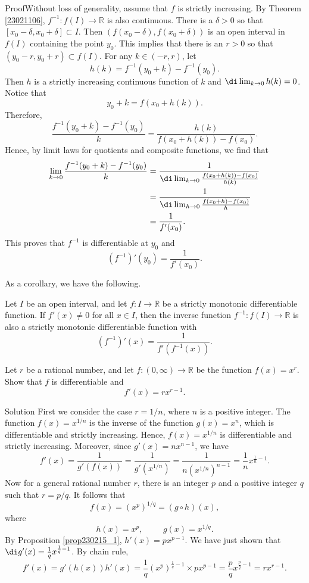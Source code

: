 \begin{myproof}{Proof}Without loss of generality, assume that $f$ is strictly increasing. 
By Theorem \ref{23021106}, $f^{-1}:f(I)\to\mathbb{R}$ is also continuous.
There is a  $\delta>0$ so that $[x_0-\delta, x_0+\delta]\subset I$. Then $(f(x_0-\delta), f(x_0+\delta))$ is an open interval in $f(I)$ containing the point $y_0$.  This implies that there is an $r>0$ so that $(y_0-r, y_0+r)\subset f(I)$. For any $k\in (-r, r)$, let 
\[h(k)=f^{-1}(y_0+k)-f^{-1}(y_0).\]Then $h$ is a strictly increasing continuous function of $k$ and  $\di\lim_{k\to 0}h(k)=0$. Notice that
\[y_0+k=f(x_0+h(k)).\]
Therefore,
\[\frac{f^{-1}(y_0+k)-f^{-1}(y_0)}{k}=\frac{h(k)}{f(x_0+h(k))-f(x_0)}.\]
\bp
Hence, by limit laws for quotients and composite functions,
we find that
\begin{align*}
\lim_{k\to 0}\frac{f^{-1}(y_0+k)-f^{-1}(y_0)}{k}&=\frac{1}{\di \lim_{k\rightarrow 0}\frac{f(x_0+h(k))-f(x_0)}{h(k)}}\\&=\frac{1}{\di \lim_{h\rightarrow 0}\frac{f(x_0+h)-f(x_0)}{h}}\\&=\frac{1}{f'(x_0)}.\end{align*}
This proves that $f^{-1}$ is differentiable at $y_0$ and
\[(f^{-1})'(y_0)=\frac{1}{f'(x_0)}.\]

 \end{myproof}

As a corollary, we have the following.
\begin{corollary}{}
Let $I$ be an open interval, and let $f:I\to\mathbb{R}$ be a strictly monotonic differentiable function. If $f'(x)\neq 0 $ for all $x\in I$, then the inverse function $f^{-1}:f(I)\to\mathbb{R}$ is also a strictly monotonic differentiable function with
\[(f^{-1})'(x)=\frac{1}{f'(f^{-1}(x))}.\]
\end{corollary}
 
\begin{example}{}
Let $r$ be a rational number, and let $f:(0,\infty)\to \mathbb{R}$ be the function $f(x)=x^r$. Show that $f$ is differentiable and 
\[f'(x)=rx^{r-1}.\]

\end{example}
\begin{solution}{Solution}
First we consider the case  $r=1/n$, where $n$ is a positive integer. The function $f(x)=x^{1/n}$ is the inverse of the function $g(x)=x^n$, which is differentiable and strictly increasing. Hence, $f(x)=x^{1/n}$ is differentiable and strictly increasing. Moreover, since $g'(x)=nx^{n-1}$, we have
\[f'(x)=\frac{1}{g'(f(x))}=\frac{1}{g'(x^{1/n})}=\frac{1}{n(x^{1/n})^{n-1}}=\frac{1}{n}x^{\frac{1}{n}-1}.\]
Now for a general rational number $r$, there is an integer $p$ and a positive integer $q$ such that
$r=p/q$. It follows that
\[f(x)=(x^p)^{1/q}=(g\circ h)(x),\]
where
\[h(x)=x^p,\hspace{1cm} g(x)=x^{1/q}.\]
By Proposition \ref{prop230215_1}, $h'(x)=px^{p-1}$. We have just shown that $\di g'(x)=\frac{1}{q}x^{\frac{1}{q}-1}$. By chain rule,
\[f'(x)=g'(h(x))h'(x)=\frac{1}{q}\left(x^p\right)^{\frac{1}{q}-1} \times px^{p-1}=\frac{p}{q}x^{\frac{p}{q}-1}=rx^{r-1}.\]
\end{solution}

